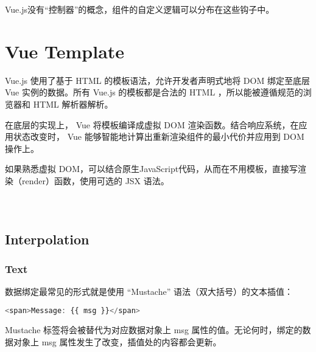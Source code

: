 Vue.js没有“控制器”的概念，组件的自定义逻辑可以分布在这些钩子中。

\chapter{Vue Template}


Vue.js 使用了基于 HTML 的模板语法，允许开发者声明式地将 DOM 绑定至底层 Vue 实例的数据。所有 Vue.js 的模板都是合法的 HTML ，所以能被遵循规范的浏览器和 HTML 解析器解析。


在底层的实现上， Vue 将模板编译成虚拟 DOM 渲染函数。结合响应系统，在应用状态改变时， Vue 能够智能地计算出重新渲染组件的最小代价并应用到 DOM 操作上。

如果熟悉虚拟 DOM，可以结合原生JavaScript代码，从而在不用模板，直接写渲染（render）函数，使用可选的 JSX 语法。



\begin{lstlisting}[language=JavaScript]

\end{lstlisting}





\begin{lstlisting}[language=JavaScript]

\end{lstlisting}




\begin{lstlisting}[language=JavaScript]

\end{lstlisting}

\section{Interpolation}


\subsection{Text}

数据绑定最常见的形式就是使用 “Mustache” 语法（双大括号）的文本插值：

\begin{lstlisting}[language=JavaScript]
<span>Message: {{ msg }}</span>
\end{lstlisting}

Mustache 标签将会被替代为对应数据对象上 msg 属性的值。无论何时，绑定的数据对象上 msg 属性发生了改变，插值处的内容都会更新。




